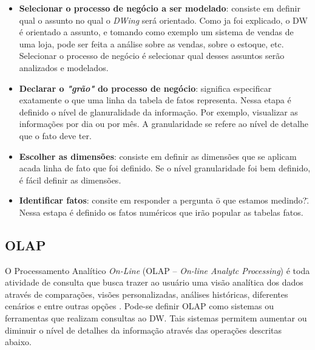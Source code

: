  \begin{itemize}

 	\item \textbf{Selecionar o processo de negócio a ser modelado}: consiste em definir qual o assunto no qual o \emph{DWing} será orientado. Como ja foi explicado, o DW é orientado a assunto, e tomando como exemplo um sistema de vendas de uma loja, pode ser feita a análise sobre as vendas, sobre o estoque, etc. Selecionar o processo de negócio é selecionar qual desses assuntos serão analizados e modelados.

 	\item \textbf{Declarar o \emph{"grão"} do processo de negócio}: significa especificar exatamente o que uma linha da tabela de fatos representa. Nessa etapa é definido o nível de glanuralidade da informação. Por exemplo, visualizar as informações por dia ou por mês. A granularidade se refere ao nível de detalhe que o fato deve ter. 

 	\item \textbf{Escolher as dimensões}: consiste em definir as dimensões que se aplicam acada linha de fato que foi definido. Se o nível granularidade foi bem definido, é fácil definir as dimensões. 

 	\item \textbf{Identificar fatos}: consite em responder a pergunta \"o que estamos medindo?\". Nessa estapa é definido os fatos numéricos que irão popular as tabelas fatos.	  
 \end{itemize}

\subsection{OLAP}

\label{sec-olap}

O Processamento Analítico \emph{On-Line} (OLAP – \emph{On-line Analytc Processing}) é toda atividade de consulta que busca trazer ao usuário uma visão analítica dos dados através de comparações, visões personalizadas, análises históricas, diferentes cenários e entre outras opções \cite{kimball2002}.
%
Pode-se definir OLAP como sistemas ou ferramentas que realizam consultas ao DW.
%
Tais sistemas permitem aumentar ou diminuir o nível de detalhes da informação através das operações descritas abaixo. 



